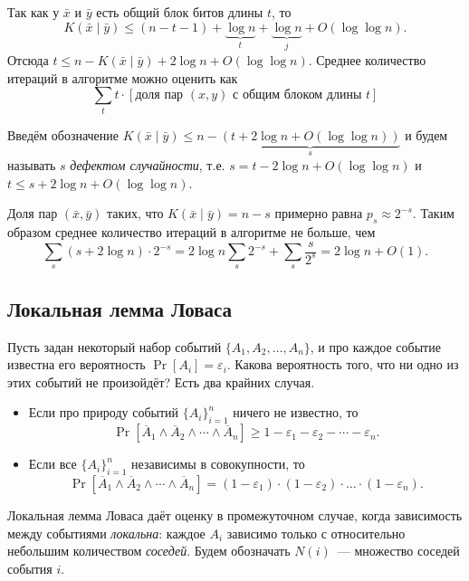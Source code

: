 \documentclass[12pt]{article}
\newcommand{\seqn}[2]{{#1}_1,{#1}_2,\dotsc,{#1}_{#2}}
\theoremstyle{definition}
\theoremstyle{plain}
\theoremstyle{remark}
\begin{document}
Так как у $\bar x$ и $\bar y$ есть общий блок битов длины $t$, то
\[
    K(\bar x\mid\bar y)\le (n-t-1) + \underbrace{\log n}_{t} + \underbrace{\log n}_{j} + O(\log\log n).
\]
Отсюда $t\le n - K(\bar x\mid\bar y) + 2\log n + O(\log\log n)$. Среднее количество
итераций в алгоритме можно оценить как
\[
    \sum_t t\cdot [\text{доля пар $(x,y)$ с общим блоком длины $t$}]
\]

Введём обозначение
$K(\bar x\mid \bar y)\le n - \underbrace{(t + 2\log n + O(\log\log n))}_{s}$ и будем
называть $s$ \emph{дефектом случайности}, т.е. $s = t - 2\log n + O(\log\log n)$ и
$t\le s + 2\log n + O(\log\log n)$.

Доля пар $(\bar x, \bar y)$ таких, что $K(\bar x\mid \bar y) = n - s$
примерно равна $p_s\approx 2^{-s}$. Таким образом среднее количество итераций в
алгоритме не больше, чем
\[
    \sum_s (s + 2\log n)\cdot 2^{-s} = 2\log n\sum_s 2^{-s} + \sum_s \frac{s}{2^s}
    = 2\log n + O(1).
\]

\subsection{Локальная лемма Ловаса}
Пусть задан некоторый набор событий $\{\seqn{A}{n}\}$, и про каждое событие
известна его вероятность $\Pr[A_i] = \varepsilon_i$. 
Какова вероятность 
того, что ни одно из этих событий не произойдёт? Есть два крайних случая. 
\begin{itemize}
    \item Если про природу событий $\{A_i\}_{i=1}^n$ ничего не известно, то
    \[
    \Pr[\overline{A}_1\land\overline{A}_2\land\dotsb\land\overline{A}_n] 
        \ge 1 - \varepsilon_1 - \varepsilon_2 -\dotsb -\varepsilon_n. 
    \]

    \item Если все $\{A_i\}_{i=1}^n$ независимы в совокупности, то
    \[
    \Pr[\overline{A}_1\land\overline{A}_2\land\dotsb\land\overline{A}_n] 
        = (1 - \varepsilon_1)\cdot(1 - \varepsilon_2) \cdot\dotso\cdot (1 - \varepsilon_n). 
    \]
\end{itemize}

Локальная лемма Ловаса даёт оценку в промежуточном случае, когда зависимость
между событиями \emph{локальна}: каждое $A_i$ зависимо только с относительно небольшим
количеством \emph{соседей}. Будем обозначать $N(i)$~--- множество соседей события $i$.
\end{document}
